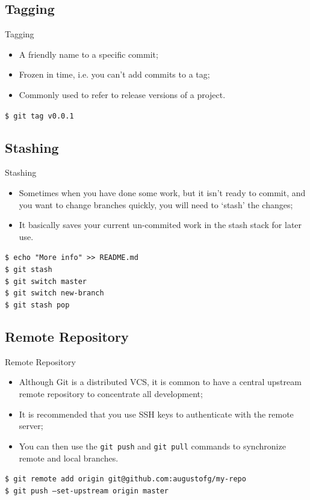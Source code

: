 \documentclass{beamer}
\begin{document}
\subsection{Tagging}
\begin{frame}{Tagging}
  \begin{itemize}
    \item A friendly name to a specific commit;
    \item Frozen in time, i.e. you can't add commits to a tag;
    \item Commonly used to refer to release versions of a project.
  \end{itemize}
  \begin{block}{}
    \texttt{\$ git tag v0.0.1}
  \end{block}
\end{frame}

\subsection{Stashing}
\begin{frame}{Stashing}
  \begin{itemize}
    \item Sometimes when you have done some work, but it isn't ready to commit, and you want to change branches quickly, you will need to `stash' the changes;
    \item It basically saves your current un-commited work in the stash stack for later use.
  \end{itemize}
  \begin{block}{}
    \texttt{\$ echo "More info" >> README.md} \\
    \texttt{\$ git stash} \\
    \texttt{\$ git switch master} \\
    \texttt{\$ git switch new-branch} \\
    \texttt{\$ git stash pop}
  \end{block}
\end{frame}

\subsection{Remote Repository}
\begin{frame}{Remote Repository}
  \begin{itemize}
    \item Although Git is a distributed VCS, it is common to have a central upstream remote repository to concentrate all development;
    \item It is recommended that you use SSH keys to authenticate with the remote server;
    \item You can then use the \texttt{git push} and \texttt{git pull} commands to synchronize remote and local branches.
  \end{itemize}
  \begin{block}{}
    \texttt{\$ git remote add origin git@github.com:augustofg/my-repo} \\
    \texttt{\$ git push --set-upstream origin master}
  \end{block}
\end{frame}
\end{document}
